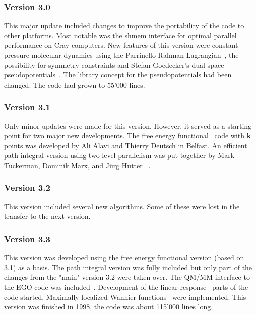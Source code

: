 \documentclass[twoside,10pt,titlepage,a4paper]{article}
\begin{document}
\subsubsection{Version 3.0}

  This major update included changes to improve the portability of the code to
other platforms. Most notable was the shmem interface for optimal parallel
performance on Cray computers. New features of this version were constant
pressure molecular dynamics using the Parrinello-Rahman Lagrangian~\cite{parrah,parrah2}, 
the possibility for symmetry constraints and Stefan Goedecker's dual space
pseudopotentials~\cite{goe_pp}. The library concept for the pseudopotentials had been
changed. The code had grown to 55'000 lines.

\subsubsection{Version 3.1}

  Only minor updates were made for this version. However, it served as a
starting point for two major new developments. The free energy functional~\cite{Alavi94} 
code with {\bf k} points was developed by Ali Alavi and Thierry Deutsch in Belfast. An
efficient path integral version using two level parallelism was put together 
by  Mark Tuckerman, Dominik Marx, and J\"urg Hutter~\cite{Tuckerman96} .

\subsubsection{Version 3.2}

  This version included several new algorithms. Some of these were lost in the
transfer to the next version.

\subsubsection{Version 3.3}

  This version was developed using the free energy functional version (based on
3.1) as a basis. The path integral version was fully included but only part of
the changes from the "main" version 3.2 were taken over. The QM/MM interface to
the EGO code was included~\cite{egoqmmm}. 
Development of the linear response~\cite{LinRes} parts of the code started.
Maximally localized Wannier functions~\cite{Marzari97} were implemented.
This version was finished in 1998, the code was about 115'000 lines
long.
\end{document}
